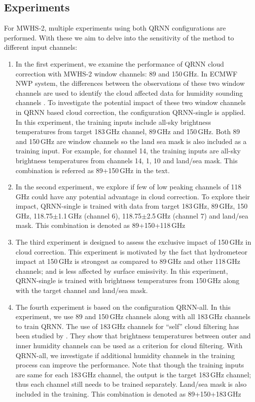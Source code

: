 \documentclass[amt, manuscript]{copernicus}
\begin{document}
\subsection{Experiments}
%
\label{sec:QRNN_expt_MWHS}
For MWHS-2, multiple experiments using both QRNN configurations are performed. With these we aim to delve into the sensitivity of the method to different input channels:

\begin{enumerate}
	
	\item In the first experiment, we examine the performance of QRNN cloud correction with MWHS-2 window channels: 89 and 150\,GHz. In ECMWF NWP system, the differences between the observations of these two window channels are used to identify the cloud affected data for humidity sounding channels \citep{geer2015scatteringindex}. To investigate the potential impact of these two window channels in QRNN based cloud correction, the configuration QRNN-single is applied. In this experiment, the training inputs include all-sky brightness temperatures from target 183\,GHz channel, 89\,GHz and 150\,GHz. Both 89 and 150\,GHz are window channels so the land sea mask is also included as a training input. For example, for channel 14, the training inputs are all-sky brightness temperatures from channels 14, 1, 10 and land/sea mask. This combination is referred as 89+150\,GHz in the text.
	
	\item In the second experiment, we explore if few of low peaking channels of 118\,GHz could have any potential advantage in cloud correction. To explore their impact, QRNN-single is trained with data from target 183\,GHz, 89\,GHz, 150\,GHz, 118.75$\pm$1.1\,GHz (channel 6), 118.75$\pm$2.5\,GHz (channel 7) and land/sea mask. This combination is denoted as 89+150+118\,GHz
	
	\item The third experiment is designed to assess the exclusive impact of 150\,GHz in cloud correction. This experiment is motivated by the fact that hydrometeor impact at 150\,GHz is strongest as compared to 89\,GHz and other 118\,GHz channels; and is less affected by surface emissivity. In this experiment, QRNN-single is trained with brightness temperatures from 150\,GHz along with the target channel and land/sea mask. 
	
	\item The fourth experiment is based on the configuration QRNN-all. In this experiment, we use 89 and 150\,GHz channels along with all 183\,GHz channels to train QRNN. The use of 183\,GHz channels for ``self'' cloud filtering has been studied by  \citet{buehler:aclou:07}. They show that brightness temperatures between outer and inner humidity channels can be used as a criterion for cloud filtering. With QRNN-all, we investigate if additional humidity channels in the training process can improve the performance. Note that though the training inputs are same for each 183\,GHz channel, the output is the target 183\,GHz channel; thus each channel still needs to be trained separately. Land/sea mask is also included in the training. This combination is denoted as 89+150+183\,GHz
\end{enumerate}
\end{document}

